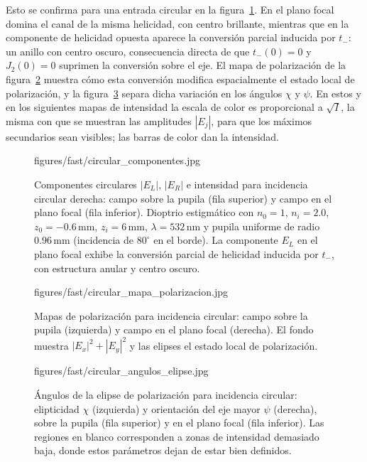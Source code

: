 Esto se confirma para una entrada circular en la figura~\ref{fig:circular-plano-focal-componentes}. En el plano focal domina el canal de la misma helicidad, con centro brillante, mientras que en la componente de helicidad opuesta aparece la conversión parcial inducida por $t_-$: un anillo con centro oscuro, consecuencia directa de que $t_-(0)=0$ y $J_2(0)=0$ suprimen la conversión sobre el eje. El mapa de polarización de la figura~\ref{fig:circular-plano-focal-mapa-polarizacion} muestra cómo esta conversión modifica espacialmente el estado local de polarización, y la figura~\ref{fig:circular-plano-focal-mapas-escalares} separa dicha variación en los ángulos $\chi$ y $\psi$. En estos y en los siguientes mapas de intensidad la escala de color es
proporcional a $\sqrt I$, la misma con que se muestran las amplitudes $|E_j|$,
para que los máximos secundarios sean visibles; las barras de color dan la
intensidad.

\begin{figure}[!htbp]
  \centering
    {figures/fast/circular_componentes.jpg}
  \caption{Componentes circulares $|E_L|$, $|E_R|$ e intensidad para incidencia circular derecha: campo sobre la pupila (fila superior) y campo en el plano focal (fila inferior). Dioptrio estigmático con $n_0=1$, $n_i=2.0$, $z_0=-0.6\,\mathrm{mm}$, $z_i=6\,\mathrm{mm}$, $\lambda=532\,\mathrm{nm}$ y pupila uniforme de radio $0.96\,\mathrm{mm}$ (incidencia de $80^\circ$ en el borde). La componente $E_L$ en el plano focal exhibe la conversión parcial de helicidad inducida por $t_-$, con estructura anular y centro oscuro.}
  \label{fig:circular-plano-focal-componentes}
\end{figure}

\begin{figure}[!htbp]
  \centering
    {figures/fast/circular_mapa_polarizacion.jpg}
  \caption{Mapas de polarización para incidencia circular: campo sobre la pupila (izquierda) y campo en el plano focal (derecha). El fondo muestra $|E_x|^2+|E_y|^2$ y las elipses el estado local de polarización.}
  \label{fig:circular-plano-focal-mapa-polarizacion}
\end{figure}

\begin{figure}[!htbp]
  \centering
    {figures/fast/circular_angulos_elipse.jpg}
  \caption{Ángulos de la elipse de polarización para incidencia circular: elipticidad $\chi$ (izquierda) y orientación del eje mayor $\psi$ (derecha), sobre la pupila (fila superior) y en el plano focal (fila inferior). Las regiones en blanco corresponden a zonas de intensidad demasiado baja, donde estos parámetros dejan de estar bien definidos.}
  \label{fig:circular-plano-focal-mapas-escalares}
\end{figure}

